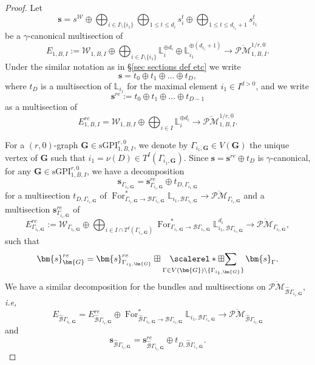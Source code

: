 \documentclass[11pt]{amsart}
\theoremstyle{definition}
\theoremstyle{remark}
\newcommand{\oPMb}{{\overline{\mathcal{PM}}}}
\newcommand{\<}{\left<}
\renewcommand{\>}{\right>}
\numberwithin{equation}{section}
\def\sGPI{\text{sGPI}}
\DeclareMathOperator*{\bboxplus}{\scalerel*{\boxplus}{\sum}}
\begin{document}
\begin{proof}
    Let 
    $$\bm{s}=s^{\mathcal W}\oplus\bigoplus_{i\in I\setminus
    \{i_1\}}\bigoplus_{1\le t \le d_i}s_i^t \oplus \bigoplus_{1\le t \le d_{i_1}+1}s_{i_1}^t$$ 
    be a $\gamma$-canonical multisection of $$E_{1,B,I}:=\mathcal W_{1,B,I}\oplus \bigoplus_{i\in I\setminus \{i_1\}} \mathbb L_i^{\oplus d_i} \oplus \mathbb L_{i_1}^{\oplus(d_{i_1}+1)}\to \oPMb^{1/r,0}_{1,B,I}.$$
    Under the similar notation as in \S\ref{sec sections def etc} we write $$\bm{s}=t_0\oplus t_1\oplus\dots \oplus t_D,$$
    where $t_D$ is a multisection of $\mathbb L_{i_1}$ for the maximal element $i_1\in I^{d>0}$, and we write 
    \begin{equation}\label{eq def remaining sec}
    \bm{s}^{re}:=t_0\oplus t_1\oplus\dots \oplus t_{D-1}
    \end{equation}
    as a multisection of 
    $$
    E^{re}_{1,B,I}=\mathcal W_{1,B,I} \oplus \bigoplus_{i\in I} \mathbb L_i^{\oplus d_i}\to \oPMb^{1/r,0}_{1,B,I}.
    $$
    
   

      For a $(r,0)$-graph $\bm{G}\in \sGPI^{r,0}_{1,B,I}$, we denote by $\Gamma_{i_1,\bm{G}}\in V(\bm{G})$ the unique vertex of $\bm{G}$ such that $i_1=\nu(D)\in T^I(\Gamma_{i_1,\bm{G}})$.   Since $\bm{s}=\bm{s}^{re}\oplus t_D$ is $\gamma$-canonical, for any $\bm{G}\in \sGPI^{r,0}_{1,B,I}$, we have a decomposition 
        $$
         \bm{s}_{\Gamma_{i_1,\bm{G}}}= \bm{s}^{re}_{\Gamma_{i_1,\bm{G}}}\oplus t_{D,\Gamma_{i_1,\bm{G}}}
        $$
        for a multisection $t_{D,\Gamma_{i_1,\bm{G}}}$ of $\operatorname{For}^*_{\Gamma_{i_1,\bm{G}}\to \mathcal B \Gamma_{i_1,\bm{G}}}\mathbb L_{i_1,\mathcal B \Gamma_{i_1,\bm{G}}}\to \oPMb_{\Gamma_{i_1,\bm{G}}}$ and a multisection $\bm{s}^{re}_{\Gamma_{i_1,\bm{G}}}$ of 
        $$
        E^{re}_{\Gamma_{i_1,\bm{G}}}:= \mathcal W_{{\Gamma_{i_1,\bm{G}}}} \oplus   \bigoplus_{i\in I \cap T^I(\Gamma_{i_1,\bm{G}})} \operatorname{For}^*_{\Gamma_{i_1,\bm{G}}\to \mathcal B \Gamma_{i_1,\bm{G}}}\mathbb L_{i_1,\mathcal B \Gamma_{i_1,\bm{G}}}^{d_{i}}
        \to \oPMb_{\Gamma_{i_1,\bm{G}}},
        $$
        such that $$\bm{s}^{re}_{\bm{G}}=\bm{s}^{re}_{\Gamma_{i_1,\bm{G}}} \boxplus \bboxplus_{\Gamma \in V(\bm{G})\setminus \{\Gamma_{i_1,\bm{G}}\}}\bm{s}_{\Gamma}.$$
        We have a similar decomposition for the bundles and multisections on $\oPMb_{\hat{\mathcal B}\Gamma_{i_1,\bm{G}}}$, \textit{i.e,}
        $$
        E_{\hat{\mathcal B}\Gamma_{i_1,\bm{G}}}=E^{re}_{\hat{\mathcal B}\Gamma_{i_1,\bm{G}}} \oplus \operatorname{For}^*_{\hat{\mathcal B}\Gamma_{i_1,\bm{G}}\to \mathcal B \Gamma_{i_1,\bm{G}}}\mathbb L_{i_1,\mathcal B \Gamma_{i_1,\bm{G}}}\to \oPMb_{\hat{\mathcal B}\Gamma_{i_1,\bm{G}}}
        $$
        and 
        $$
        \bm{s}_{\hat{\mathcal B}\Gamma_{i_1,\bm{G}}}= \bm{s}^{re}_{\hat{\mathcal B}\Gamma_{i_1,\bm{G}}} \oplus t_{D,\hat{\mathcal B}\Gamma_{i_1,\bm{G}}}.
        $$
    

\end{proof}
\end{document}
